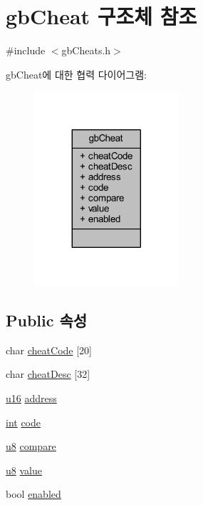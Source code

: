 \hypertarget{structgb_cheat}{}\section{gb\+Cheat 구조체 참조}
\label{structgb_cheat}


{\ttfamily \#include $<$gb\+Cheats.\+h$>$}



gb\+Cheat에 대한 협력 다이어그램\+:\nopagebreak
\begin{figure}[H]
\begin{center}
\leavevmode
\includegraphics[width=152pt]{structgb_cheat__coll__graph}
\end{center}
\end{figure}
\subsection*{Public 속성}
\begin{DoxyCompactItemize}
\item 
char \mbox{\hyperlink{structgb_cheat_ae91f81b3b07bd842606880b4fb1a74a8}{cheat\+Code}} \mbox{[}20\mbox{]}
\item 
char \mbox{\hyperlink{structgb_cheat_aeddcedaba8d5c8f0a9c6eb4903a321fa}{cheat\+Desc}} \mbox{[}32\mbox{]}
\item 
\mbox{\hyperlink{_system_8h_a9e6c91d77e24643b888dbd1a1a590054}{u16}} \mbox{\hyperlink{structgb_cheat_a9cd0d16b2f8cfad6408130d037181559}{address}}
\item 
\mbox{\hyperlink{_util_8cpp_a0ef32aa8672df19503a49fab2d0c8071}{int}} \mbox{\hyperlink{structgb_cheat_ab501c0fb95ea8338237734ec8e2fc981}{code}}
\item 
\mbox{\hyperlink{_system_8h_aed742c436da53c1080638ce6ef7d13de}{u8}} \mbox{\hyperlink{structgb_cheat_aae5ac2290ab371e369b8c11789b5d7f9}{compare}}
\item 
\mbox{\hyperlink{_system_8h_aed742c436da53c1080638ce6ef7d13de}{u8}} \mbox{\hyperlink{structgb_cheat_acabb64808f69357b955b5c9f464c9cc1}{value}}
\item 
bool \mbox{\hyperlink{structgb_cheat_af45ed85e44d6d20c3f0f9be2e2fd8c3b}{enabled}}
\end{DoxyCompactItemize}


